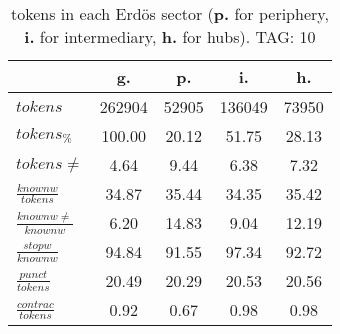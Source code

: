 \begin{table}[h!]
\begin{center}
\begin{tabular}{| l | c | c | c | c |}\hline
 & g. & p. & i. & h. \\\hline
$tokens$ & 262904  & 52905  & 136049  & 73950 \\\hline
$tokens_{\%}$ & 100.00  & 20.12  & 51.75  & 28.13 \\\hline
$tokens \neq$ & 4.64  & 9.44  & 6.38  & 7.32 \\\hline
$\frac{knownw}{tokens}$ & 34.87  & 35.44  & 34.35  & 35.42 \\\hline
$\frac{knownw \neq}{knownw}$ & 6.20  & 14.83  & 9.04  & 12.19 \\\hline
$\frac{stopw}{knownw}$ & 94.84  & 91.55  & 97.34  & 92.72 \\\hline
$\frac{punct}{tokens}$ & 20.49  & 20.29  & 20.53  & 20.56 \\\hline
$\frac{contrac}{tokens}$ & 0.92  & 0.67  & 0.98  & 0.98 \\\hline
\end{tabular}
\caption{tokens in each Erd\"os sector ({{\bf p.}} for periphery, {{\bf i.}} for intermediary, 
    {{\bf h.}} for hubs). TAG: 10}
\end{center}
\end{table}